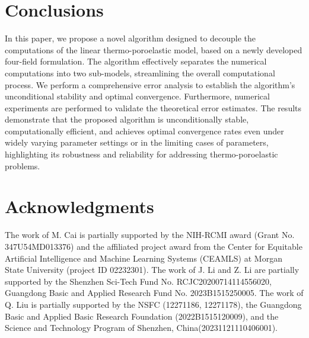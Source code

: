 \documentclass{article}
\numberwithin{equation}{section}
\begin{document}
\section{Conclusions}
In this paper, we propose a novel algorithm designed to decouple the computations of the linear thermo-poroelastic model, based on a newly developed four-field formulation. The algorithm effectively separates the numerical computations into two sub-models, streamlining the overall computational process. We perform a comprehensive error analysis to establish the algorithm's unconditional stability and optimal convergence. Furthermore, numerical experiments are performed to validate the theoretical error estimates. The results demonstrate that the proposed algorithm is unconditionally stable, computationally efficient, and achieves optimal convergence rates even under widely varying parameter settings or in the limiting cases of parameters, highlighting its robustness and reliability for addressing thermo-poroelastic problems.


\section*{Acknowledgments}
The work of M. Cai is partially supported by the NIH-RCMI award (Grant No. 347U54MD013376) and the affiliated project award from the Center for Equitable Artificial Intelligence and Machine Learning Systems (CEAMLS) at Morgan State University (project ID 02232301). The work of J. Li and Z. Li are partially supported by the Shenzhen Sci-Tech Fund No. RCJC20200714114556020, 
Guangdong Basic and Applied Research Fund No. 2023B1515250005.
The work of Q. Liu is partially supported by the NSFC (12271186, 12271178), the Guangdong Basic and Applied Basic Research Foundation (2022B1515120009), and the Science and Technology Program of Shenzhen, China(20231121110406001).
 


 


\end{document}
